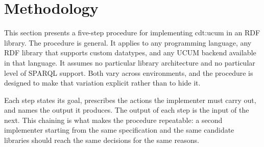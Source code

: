 \chapter{Methodology}

This section presents a five-step procedure for implementing cdt:ucum in an RDF library. The procedure is general. It applies to any programming language, any RDF library that supports custom datatypes, and any UCUM backend available in that language. It assumes no particular library architecture and no particular level of SPARQL support. Both vary across environments, and the procedure is designed to make that variation explicit rather than to hide it.

Each step states its goal, prescribes the actions the implementer must carry out, and names the output it produces. The output of each step is the input of the next. This chaining is what makes the procedure repeatable: a second implementer starting from the same specification and the same candidate libraries should reach the same decisions for the same reasons.


